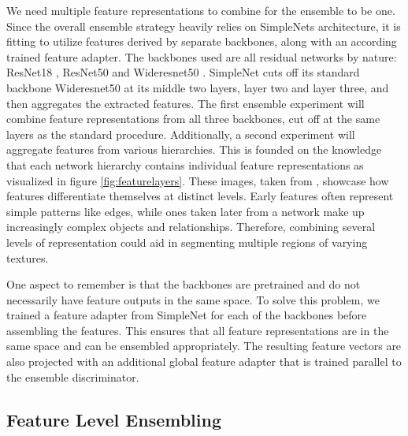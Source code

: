 We need multiple feature representations to combine for the ensemble to be one. Since the overall ensemble strategy heavily relies on SimpleNets \cite{liu2023simplenet} architecture, 
it is fitting to utilize features derived by separate backbones, along with an according trained feature adapter.\newline
The backbones used are all residual networks by nature: ResNet18 \cite{He_2016resnet}, ResNet50 \cite{He_2016resnet} and Wideresnet50 \cite{wideresnet}. SimpleNet cuts off its 
standard backbone Wideresnet50 at its middle two layers, layer two and layer three, and then aggregates the extracted features. The first ensemble experiment will combine 
feature representations from all three backbones, cut off at the same layers as the standard procedure. Additionally, a second experiment will aggregate features 
from various hierarchies. This is founded on the knowledge that each network hierarchy contains individual feature representations as visualized in figure \ref{fig:featurelayers}. 
These images, taken from \cite{openaifeaturerepres}, showcase how features differentiate themselves at distinct levels. Early features often represent simple patterns like edges, 
while ones taken later from a network make up increasingly complex objects and relationships. Therefore, combining several levels of representation could aid in segmenting 
multiple regions of varying textures.



One aspect to remember is that the backbones are pretrained and do not necessarily have feature outputs in the same space. 
To solve this problem, we trained a feature adapter from SimpleNet for each of the backbones before assembling the features. 
This ensures that all feature representations are in the same space and can be ensembled appropriately. The resulting feature vectors are also projected with an additional global 
feature adapter that is trained parallel to the ensemble discriminator.


\subsection{Feature Level Ensembling}
\label{sec:featurelevelensemble}

